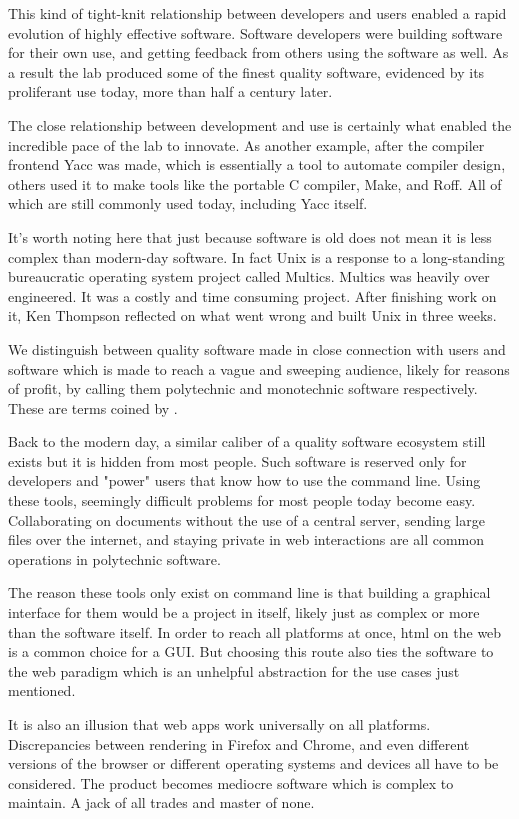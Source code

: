 This kind of tight-knit relationship between developers and users enabled a
rapid evolution of highly effective software. Software developers were building
software for their own use, and getting feedback from others using the software
as well. As a result the lab produced some of the finest quality software,
evidenced by its proliferant use today, more than half a century later.

The close relationship between development and use is certainly what enabled
the incredible pace of the lab to innovate. As another example, after the
compiler frontend Yacc was made, which is essentially a tool to automate
compiler design, others used it to make tools like the portable C
compiler, Make, and Roff. All of which are still commonly used today, including Yacc
itself.

It's worth noting here that just because software is old does not mean it is
less complex than modern-day software. In fact Unix is a response to
a long-standing bureaucratic operating system project called Multics. Multics
was heavily over engineered. It was a costly and time consuming project. After
finishing work on it, Ken Thompson reflected on what went wrong and built
Unix in three weeks.

We distinguish between quality software made in close connection with users and
software which is made to reach a vague and sweeping audience, likely for
reasons of profit, by calling them polytechnic and monotechnic software
respectively. These are terms coined by .

Back to the modern day, a similar caliber of a quality software ecosystem still
exists but it is hidden from most people. Such software is reserved only for
developers and "power" users that know how to use the command line. Using these
tools, seemingly difficult problems for most people today become easy.
Collaborating on documents without the use of a central server, sending large
files over the internet, and staying private in web interactions are all common
operations in polytechnic software.

The reason these tools only exist on command line is that building a graphical
interface for them would be a project in itself, likely just as complex or more
than the software itself. In order to reach all platforms at once, html on the
web is a common choice for a GUI. But choosing this route also ties the
software to the web paradigm which is an unhelpful abstraction for the
use cases just mentioned.

It is also an illusion that web apps work universally on all platforms.
Discrepancies between rendering in Firefox and Chrome, and even
different versions of the browser or different operating systems and devices
all have to be considered. The product becomes mediocre software which is complex to
maintain. A jack of all trades and master of none.

